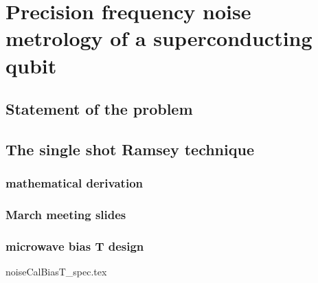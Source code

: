 \chapter{Precision frequency noise metrology of a superconducting qubit}

\section{Statement of the problem}

\section{The single shot Ramsey technique}

\subsection{mathematical derivation}

\subsection{March meeting slides}

\subsection{microwave bias T design}

{noiseCalBiasT_spec.tex}


